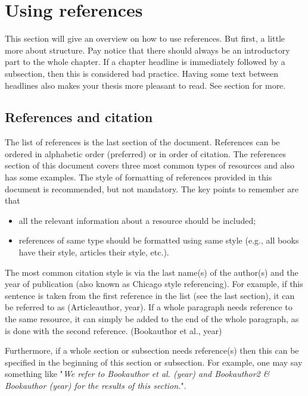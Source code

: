 \section{Using references}

This section will give an overview on how to use references. But first, a little more about structure. Pay notice that there should always be an introductory part to the whole chapter. If a chapter headline is immediately followed by a subsection, then this is considered bad practice. Having some text between headlines also makes your thesis more pleasant to read. See  section for more.

\subsection{References and citation}

The list of references is the last section of the document. References can be ordered in alphabetic order (preferred) or in order of citation. The references section of this document covers three most common types of resources and also has some examples. 
The style of formatting of references provided in this document is recommended, but not mandatory. The key points to remember are that 
\vspace{-2mm}
\begin{itemize}
\item all the relevant information about a resource should be included;
\item references of same type should be formatted using same style (e.g., all books have their style, articles their style, etc.).
\end{itemize}

The most common citation style is via the last name(s) of the author(s) and the year of publication (also known as Chicago style referencing). For example, if this sentence is taken from the first reference in the list (see the last section), it can be referred to as (Articleauthor, year). If a whole paragraph needs reference to the same resource, it can simply be added to the end of the whole paragraph, as is done with the second reference. (Bookauthor et al., year)

Furthermore, if a whole section or subsection needs reference(s) then this can be specified in the beginning of this section or subsection. For example, one may say something like "\textit{We refer to Bookauthor et al. (year) and Bookauthor2 \& Bookauthor (year) for the results of this section.}". 

